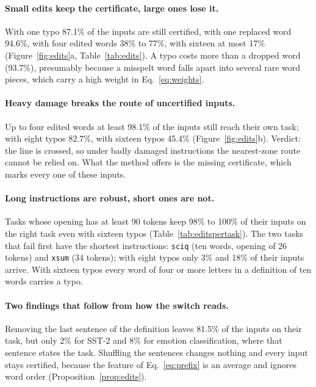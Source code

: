 \paragraph{Small edits keep the certificate, large ones lose it.} With one typo 87.1\% of the inputs
are still certified, with one replaced word 94.6\%, with four edited words 38\% to 77\%, with sixteen
at most 17\% (Figure~\ref{fig:edits}a, Table~\ref{tab:edits}). A typo costs more than a dropped word (93.7\%), presumably because a misspelt word falls apart into
several rare word pieces, which carry a high weight in Eq.~\eqref{eq:weights}.

\paragraph{Heavy damage breaks the route of uncertified inputs.} Up to four edited
words at least 98.1\% of the inputs still reach their own task; with eight typos 82.7\%, with
sixteen typos 45.4\% (Figure~\ref{fig:edits}b). Verdict: the line is crossed, so under badly damaged instructions the nearest-zone route cannot be relied on. What the method offers is the missing certificate, which marks every one of these inputs.

\paragraph{Long instructions are robust, short ones are not.} Tasks whose opening has at least 90 tokens keep
98\% to 100\% of their inputs on the right task even with sixteen typos (Table~\ref{tab:editspertask}). The two tasks that fail
first have the shortest instructions: \texttt{sciq} (ten words, opening of 26
tokens) and \texttt{xsum} (34 tokens); with eight typos only 3\% and 18\% of their inputs arrive. With sixteen typos every word of four or more letters in a definition of ten words carries a typo.

\paragraph{Two findings that follow from how the switch reads.} Removing the last sentence of the
definition leaves 81.5\% of the inputs on their task, but only 2\% for SST-2 and 8\% for emotion
classification, where that sentence states the task. Shuffling the
sentences changes nothing and every input stays certified, because the feature of
Eq.~\eqref{eq:prefix} is an average and ignores word order
(Proposition~\ref{prop:edits}).

